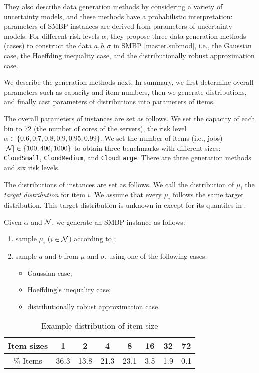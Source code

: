They also describe data generation methods by considering a variety of uncertainty models, and these methods have a probabilistic interpretation: parameters of SMBP instances are derived from parameters of uncertainty models. For different risk levels $\alpha$, they propose three data generation methods (cases) to construct the data $a,b, \sigma$ in SMBP \eqref{master.submod}, i.e., the Gaussian case, the Hoeffding inequality case, and the distributionally robust approximation case.


 We describe the generation methods next. In summary, we first determine overall parameters such as capacity and item numbers, then we generate distributions, and finally cast  parameters of distributions into parameters of items.

The overall parameters of instances are set as follows.
We set the capacity of each bin to 72 (the number of cores of the servers),  the risk level $\alpha \in \{0.6, 0.7, 0.8, 0.9, 0.95,0.99\}$. We set the number of items (i.e., jobs) $|\mathcal N| \in \{100, 400, 1000\}$ to obtain three benchmarks with different sizes: \texttt{CloudSmall}, \texttt{CloudMedium}, and \texttt{CloudLarge}. There are three generation methods and six risk levels.
 
 

The distributions of instances are set as follows.
We call the distribution of $\mu_i$ the \textit{target distribution} for item $i$. We assume that every $\mu_i$ follows the same target distribution. This target distribution is  unknown in \cite{cohen2019overcommitment} except for  its quantiles in .

Given $\alpha$ and $\mathcal N$, we generate an SMBP instance as follows:
\begin{enumerate}
    \item sample $\mu_i$  ($i \in \mathcal N$)  according to  ;
    \item sample $a$ and $b$ from $\mu$ and $\sigma$, using one of the following cases:
    \begin{itemize}
    \item Gaussian case;
    \item Hoeffding’s inequality case;
    \item distributionally robust approximation case.
    \end{itemize}
\end{enumerate}


\begin{table}[htbp]
\centering
\caption{Example distribution of item size}
\begin{tabular}{c c c c c c c c}
\hline
 Item sizes &  1 &  2 &  4 & 8 & 16 & 32  & 72\\
 \hline
\% Items  & 36.3  & 13.8 & 21.3 & 23.1 & 3.5 & 1.9 & 0.1\\
\hline
\end{tabular}
\label{itemdist}
\end{table}


